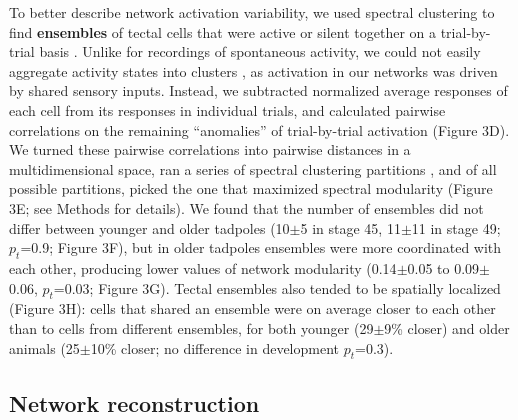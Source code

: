 \documentclass{article}
\begin{document}
To better describe network activation variability, we used spectral clustering to find \textbf{ensembles} of tectal cells that were active or silent together on a trial-by-trial basis \citep{thompson2016ensembles}. Unlike for recordings of spontaneous activity, we could not easily aggregate activity states into clusters \citep{avitan2017spontaneous}, as activation in our networks was driven by shared sensory inputs. Instead, we subtracted normalized average responses of each cell from its responses in individual trials, and calculated pairwise correlations on the remaining “anomalies” of trial-by-trial activation (Figure 3D). We turned these pairwise correlations into pairwise distances in a multidimensional space, ran a series of spectral clustering partitions \citep{ng2002spectral}, and of all possible partitions, picked the one that maximized spectral modularity \citep{newman2006modularity,gomez2009community} (Figure 3E; see Methods for details). We found that the number of ensembles did not differ between younger and older tadpoles (10$\pm$5 in stage 45, 11$\pm$11 in stage 49; $p_t$=0.9; Figure 3F), but in older tadpoles ensembles were more coordinated with each other,  producing lower values of network modularity (0.14$\pm$0.05 to 0.09$\pm$0.06, $p_t$=0.03; Figure 3G). Tectal ensembles also tended to be spatially localized (Figure 3H): cells that shared an ensemble were on average closer to each other than to cells from different ensembles, for both younger (29$\pm$9\% closer) and older animals (25$\pm$10\% closer; no difference in development $p_t$=0.3).

\subsection*{Network reconstruction}
\end{document}
